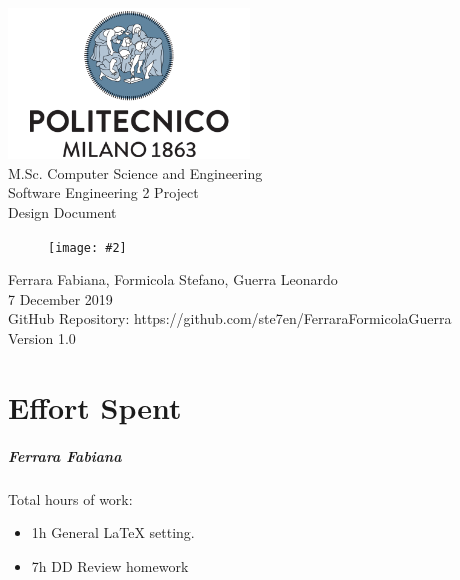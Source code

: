 \documentclass{report}
\newcommand{\image}[4]{
	\begin{figure}[H]
	\centering
	\texttt{[image: \#2]}
	\caption*{#3}
	\label{#4}

	\label{fig:nonfloat} %
	\end{figure}
}
\begin{document}
	\begin{titlepage}
		\centering	
		\vfill
		{
			\includegraphics[width =\linewidth, height = 4cm, keepaspectratio]{./Images/PolitecnicoLogo.png}
			\label{fig:PolitecnicoLogo}
			\large \\[2ex]M.Sc. Computer Science and Engineering\\
			\large Software Engineering 2 Project\\[9ex]			
			\huge Design Document\\[4ex]
			\image{3cm}{Images/Logo.png}{}{Logo}

			\normalsize Ferrara Fabiana, Formicola Stefano, Guerra Leonardo\\[1.5ex]
			\normalsize 7 December 2019 \\[1.5ex]
			\normalsize GitHub Repository: https://github.com/ste7en/FerraraFormicolaGuerra\\[3ex]
			\normalsize Version 1.0


		}
		
	\end{titlepage}


	
	\newpage
	\tableofcontents
	\thispagestyle{fancy}
	

	
	
	
	
	
	
		
	\chapter{Effort Spent}
	\thispagestyle{fancy}
		\paragraph{Ferrara Fabiana} Total hours of work: 
			\begin{itemize}
				\item 1h General LaTeX setting.
				\item 7h DD Review homework
				
			\end{itemize}
\end{document}
